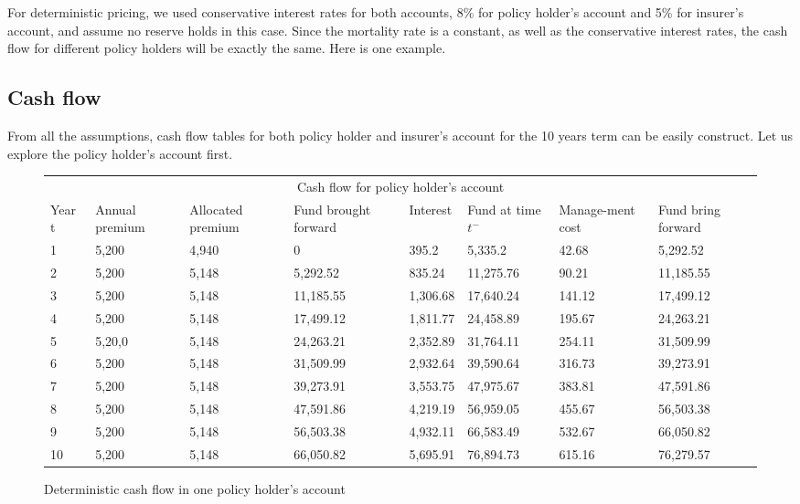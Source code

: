 \documentclass{report}
\begin{document}
For deterministic pricing, we used conservative interest rates for both accounts, 8\% for policy holder's account and 5\% for insurer's account, and assume no reserve holds in this case. Since the mortality rate is a constant, as well as the conservative interest rates, the cash flow for different policy holders will be exactly the same. Here is one example.

\subsection{Cash flow}

From all the assumptions, cash flow tables for both policy holder and insurer's account for the  10 years term can be easily construct. Let us explore the policy holder's account first. 



\begin{figure}[H]
\begin{tabular}{p{1cm} p{1.5cm} p{1.5cm} p{2cm} p{1.5cm} p{2cm} p{1.5cm} p{1.5cm} }
\toprule
\multicolumn{8}{c}{Cash flow for policy holder's account} \\
\cmidrule(r){3-7}

Year t & Annual premium & Allocated premium & Fund brought forward & Interest & Fund at time $t^-$ & Manage-ment cost & Fund bring forward \\
\midrule
1	&5,200	&4,940	&0&	395.2	&5,335.2	&42.68	&5,292.52\\
2	&5,200	&5,148	&5,292.52	 &   835.24	&11,275.76 &	90.21	&11,185.55\\
3	&5,200	&5,148	&11,185.55&  1,306.68	&17,640.24	&141.12  &17,499.12\\
4&	5,200	&5,148	&17,499.12&  1,811.77&	24,458.89	&    195.67       &24,263.21\\
5&	5,20,0	&5,148&	24,263.21	&    2,352.89&	31,764.11	&   254.11	&31,509.99\\
6&	5,200	&5,148&	31,509.99	&   2,932.64&	39,590.64	&   316.73	&39,273.91\\
7&	5,200	&5,148&	39,273.91	&   3,553.75&	47,975.67	&   383.81	&47,591.86\\
8&	5,200	&5,148&	47,591.86	&   4,219.19&	56,959.05	&  455.67	    &56,503.38\\
9&	5,200	&5,148&	56,503.38	&   4,932.11&	66,583.49	&  532.67 	&66,050.82\\
10&	5,200	&5,148	&66,050.82	&5,695.91	&76,894.73	&615.16	&76,279.57\\
\bottomrule
\end{tabular}
\label{determ-PHcashflow}
\caption{Deterministic cash flow in one policy holder's account}
\end{figure}
\end{document}
